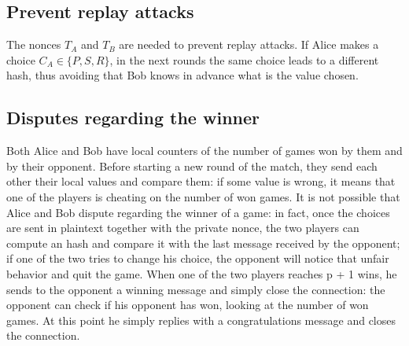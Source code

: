 \documentclass[11 pt]{article}
\begin{document}
\subsection{Prevent replay attacks}
The nonces $T_A$ and $T_B$ are needed to prevent replay attacks. If Alice makes a choice $C_A \in \{P, S, R\}$, in the next rounds the same choice leads to a different hash, thus avoiding that Bob knows in advance what is the value chosen.

\subsection{Disputes regarding the winner}
Both Alice and Bob have local counters of the number of games won by them and by their opponent. Before starting a new round of the match, they send each other their local values and compare them: if some value is wrong, it means that one of the players is cheating on the number of won games. It is not possible that Alice and Bob dispute regarding the winner of a game: in fact, once the choices are sent in plaintext together with the private nonce, the two players can compute an hash and compare it with the last message received by the opponent; if one of the two tries to change his choice, the opponent will notice that unfair behavior and quit the game. When one of the two players reaches p + 1 wins, he sends to the opponent a winning message and simply close the connection: the opponent can check if his opponent has won, looking at the number of won games. At this point he simply replies with a congratulations message and closes the connection.
\end{document}
